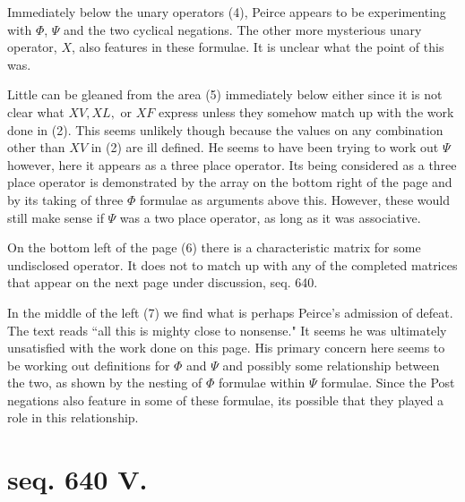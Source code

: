 Immediately below the unary operators (4), Peirce appears to be experimenting with $\Phi$, $\Psi$ and the two cyclical negations. The other more mysterious unary operator, $X$, also features in these formulae. It is unclear what the point of this was.

Little can be gleaned from the area (5) immediately below either since it is not clear what $XV, XL,$ or $XF$ express unless they somehow match up with the work done in (2). This seems unlikely though because the values on any combination other than $XV$ in (2) are ill defined. He seems to have been trying to work out $\Psi$ however, here it appears as a three place operator. Its being considered as a three place operator is demonstrated by the array on the bottom right of the page and by its taking of three $\Phi$ formulae as arguments above this. However, these would still make sense if $\Psi$ was a two place operator, as long as it was associative.

On the bottom left of the page (6) there is a characteristic matrix for some undisclosed operator. It does not to match up with any of the completed matrices that appear on the next page under discussion, seq. 640.

In the middle of the left (7) we find what is perhaps Peirce's admission of defeat. The text reads ``all this is mighty close to nonsense." It seems he was ultimately unsatisfied with the work done on this page. His primary concern here seems to be working out definitions for $\Phi$ and $\Psi$ and possibly some relationship between the two, as shown by the nesting of $\Phi$ formulae within $\Psi$ formulae. Since the Post negations also feature in some of these formulae, its possible that they played a role in this relationship.

\section{seq. 640 V.}

